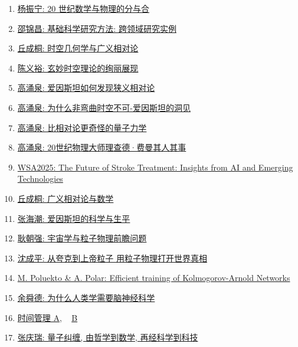 \documentclass[11pt]{article}
\begin{document}
\begin{enumerate}
	\item \href{https://mp.weixin.qq.com/s/uVdW4G3vbp0NHbuQ-F3Csg}{杨振宁: 20 世纪数学与物理的分与合}	%
	\item \href{https://mp.weixin.qq.com/s/mn_XEd9a3maHXnJJDc2--Q}{邵锦昌: 基础科学研究方法: 跨领域研究实例}	%
	\item \href{https://mp.weixin.qq.com/s/4xGp2PjOZaxsXFPSJ9-iEQ}{丘成桐: 时空几何学与广义相对论}	%
	\item \href{https://mp.weixin.qq.com/s/YAAfDzpLc69hiOKjX0vVVQ}{陈义裕: 玄妙时空理论的绚丽展现}	%
	\item \href{https://mp.weixin.qq.com/s/2O0377rTEINq5jMCnm_PNw}{高涌泉: 爱因斯坦如何发现狭义相对论}	%
	\item \href{https://mp.weixin.qq.com/s/4nFEYIH51VraTI30JjQrhg}{高涌泉: 为什么非弯曲时空不可-爱因斯坦的洞见}	%
	\item \href{https://mp.weixin.qq.com/s/ETtGyYwkDtkQwZns4NMEzw}{高涌泉: 比相对论更奇怪的量子力学}	%
	\item \href{https://mp.weixin.qq.com/s/ZksWAeyMlvl5G52R8HNXaA}{高涌泉: 20世纪物理大师理查德·费曼其人其事}	%
	\item \href{https://mp.weixin.qq.com/s/69TNSGhalcbiyZes2ItHNg}{WSA2025: The Future of Stroke Treatment: Insights from AI and Emerging Technologies}	%
	\item \href{https://mp.weixin.qq.com/s/nFFqyTDZg3VYadGgvXKNNA}{丘成桐: 广义相对论与数学}	%
	\item \href{https://mp.weixin.qq.com/s/3XLe4oFvgRdtNwqIxLGSaA}{张海潮: 爱因斯坦的科学与生平}	%
	\item \href{https://mp.weixin.qq.com/s/5OfUXxpPaf_clj0yRoxyTA}{耿朝强: 宇宙学与粒子物理前瞻问题}	%
	\item \href{https://mp.weixin.qq.com/s/hWlIRgg8AVSC-jTHJpN_Tg}{沈成平: 从夸克到上帝粒子 用粒子物理打开世界真相}	%
	\item \href{https://mp.weixin.qq.com/s/u9U_RwAC0Gv3wOdP9QVjow}{M. Poluekto \& A. Polar: Efficient training of Kolmogorov-Arnold Networks}	%
	\item \href{https://mp.weixin.qq.com/s/tMLB4FfYv9d9nb_bCFmSnA}{余舜德: 为什么人类学需要脑神经科学}	%
	\item  \href{https://mp.weixin.qq.com/s/RCEL5QsWwj4csM_gzPI0Xw}{时间管理 A}, ~  \href{https://mp.weixin.qq.com/s/d5XTugV4AYyQLfvU9mhJuA}{B}	%
	\item \href{https://mp.weixin.qq.com/s/tztr4DGH0Hz8Qw-4tjZNow}{张庆瑞: 量子纠缠, 由哲学到数学, 再经科学到科技}	%

\end{enumerate}
\end{document}
